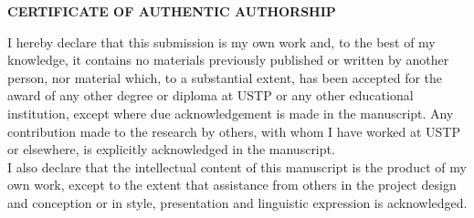 {\baselineskip

\begin{center}
{\bf CERTIFICATE OF AUTHENTIC AUTHORSHIP}\\[24pt]
\end{center}

I hereby declare that this submission is my own work and, to the best of my knowledge, it contains no materials previously published or written by another person, nor material which, to a substantial extent, has been accepted for the award of any other degree or diploma at USTP or any other educational institution, except where due acknowledgement is made in the manuscript. Any contribution made to the research by others, with whom I have worked at USTP or elsewhere, is explicitly acknowledged in the manuscript.\\

I also declare that the intellectual content of this manuscript is the product of my own work, except to the extent that assistance from others in the project design and conception or in style, presentation and linguistic expression is acknowledged.\\[12pt]


}